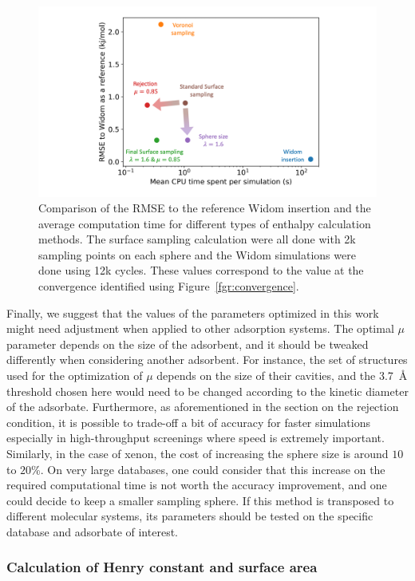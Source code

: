 \documentclass[main]{subfiles}
\begin{document}
\begin{figure}[ht]
\centering
  \includegraphics[width=\linewidth]{figures/3-fastsim/methods_comparison.png}
  \caption{Comparison of the RMSE to the reference Widom insertion and the average computation time for different types of enthalpy calculation methods. The surface sampling calculation were all done with 2k sampling points on each sphere and the Widom simulations were done using 12k cycles. These values correspond to the value at the convergence identified using Figure~\ref{fgr:convergence}. }\label{fgr:sumup}
\end{figure}

Finally, we suggest that the values of the parameters optimized in this work might need adjustment when applied to other adsorption systems. The optimal $\mu$ parameter depends on the size of the adsorbent, and it should be tweaked differently when considering another adsorbent. For instance, the set of structures used for the optimization of $\mu$ depends on the size of their cavities, and the \SI{3.7}{\angstrom} threshold chosen here would need to be changed according to the kinetic diameter of the adsorbate. Furthermore, as aforementioned in the section on the rejection condition, it is possible to trade-off a bit of accuracy for faster simulations especially in high-throughput screenings where speed is extremely important. Similarly, in the case of xenon, the cost of increasing the sphere size is around $10$ to {$20$\%}. On very large databases, one could consider that this increase on the required computational time is not worth the accuracy improvement, and one could decide to keep a smaller sampling sphere. If this method is transposed to different molecular systems, its parameters should be tested on the specific database and adsorbate of interest.


\subsubsection{Calculation of Henry constant and surface area}
\end{document}
